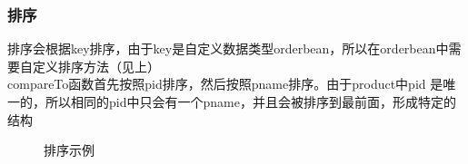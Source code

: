 \documentclass[a4paper,UTF8]{article}
\numberwithin{equation}{section}
\begin{document}
\subsubsection{排序}
排序会根据key排序，由于key是自定义数据类型orderbean，所以在orderbean中需要自定义排序方法（见上）\\
compareTo函数首先按照pid排序，然后按照pname排序。由于product中pid 是唯一的，所以相同的pid中只会有一个pname，并且会被排序到最前面，形成特定的结构
\begin{figure}[H]
    \centering
    \vfill
    \caption{排序示例}
\end{figure}
\end{document}
